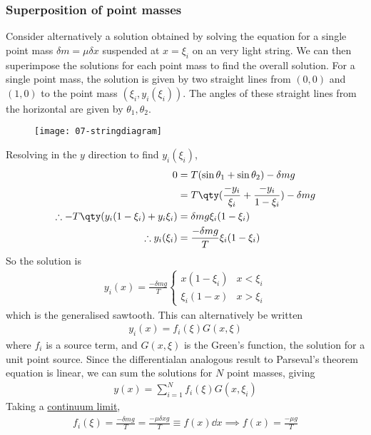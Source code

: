 \subsubsection{Superposition of point masses}
Consider alternatively a solution obtained by solving the equation for a single point mass $\delta m = \mu \delta x$ suspended at $x = \xi_i$ on an very light string.
We can then superimpose the solutions for each point mass to find the overall solution.
For a single point mass, the solution is given by two straight lines from $(0,0)$ and $(1,0)$ to the point mass $(\xi_i, y_i(\xi_i))$.
The angles of these straight lines from the horizontal are given by $\theta_1, \theta_2$.
\begin{figure}[h] 
    \centering 
    \texttt{[image: 07-stringdiagram]} 
\end{figure}
Resolving in the $y$ direction to find $y_i(\xi_i)$,
\begin{align*}
	0 & = T (\sin \theta_1 + \sin \theta_2) - \delta m g \\
	& = T\qty(\frac{-y_i}{\xi_i} + \frac{-y_i}{1-\xi_i}) - \delta m g \\
	\therefore -T\qty(y_i(1-\xi_i) + y_i \xi_i) & = \delta m g \xi_i(1-\xi_i) \\
	\therefore y_i(\xi_i) & = \frac{-\delta m g}{T} \xi_i (1-\xi_i)
\end{align*}
So the solution is
\begin{align*}
	y_i(x) = \frac{-\delta m g}{T} \begin{cases}
		x(1-\xi_i)    & x < \xi_i \\
		\xi_i (1 - x) & x > \xi_i
	\end{cases}
\end{align*}
which is the generalised sawtooth.
This can alternatively be written
\begin{align*}
	y_i(x) = f_i(\xi) G(x,\xi)
\end{align*}
where $f_i$ is a source term, and $G(x,\xi)$ is the Green's function, the solution for a unit point source.
Since the differentialan analogous result to Parseval’s theorem equation is linear, we can sum the solutions for $N$ point masses, giving
\begin{align*}
	y(x) = \sum_{i=1}^N f_i(\xi) G(x, \xi_i)
\end{align*}
Taking a \underline{continuum limit},
\begin{align*}
	f_i(\xi) = \frac{-\delta m g}{T} = \frac{-\mu \delta x g}{T} \equiv f(x) \dd{x} \implies f(x) = \frac{-\mu g}{T}
\end{align*}
